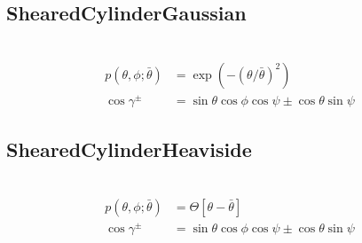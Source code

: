 
\newpage
\subsection{ShearedCylinderGaussian}
\label{sect:ShearedCylinderGaussian}
~\\
\begin{align}
p(\theta,\phi;\bar{\theta}) & = \exp(-(\theta/\bar{\theta})^2) \\
\cos\gamma^\pm & = \sin\theta\cos\phi\cos\psi\pm\cos\theta\sin\psi
\end{align}


\newpage
\subsection{ShearedCylinderHeaviside} ~\\

\begin{align}
p(\theta,\phi;\bar{\theta}) & = \Theta[\theta-\bar{\theta}] \\
\cos\gamma^\pm & = \sin\theta\cos\phi\cos\psi\pm\cos\theta\sin\psi
\end{align}

%

